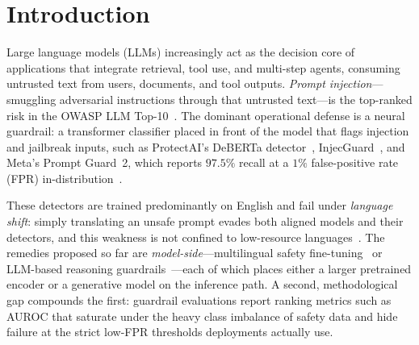 \documentclass[pdflatex,sn-mathphys-num]{sn-jnl}
\theoremstyle{plain}
\begin{document}

\maketitle

\section{Introduction}\label{sec:introduction}

Large language models (LLMs) increasingly act as the decision core of applications
that integrate retrieval, tool use, and multi-step agents, consuming untrusted text
from users, documents, and tool outputs. \emph{Prompt injection}---smuggling
adversarial instructions through that untrusted text---is the top-ranked risk in the
OWASP LLM Top-10~\cite{owasp2025}. The dominant operational defense is a neural
guardrail: a transformer classifier placed in front of the model that flags
injection and jailbreak inputs, such as ProtectAI's DeBERTa detector~\cite{protectai2024},
InjecGuard~\cite{injecguard2024}, and Meta's Prompt Guard~2, which reports $97.5\%$
recall at a $1\%$ false-positive rate (FPR) in-distribution~\cite{metapromptguard2}.

These detectors are trained predominantly on English and fail under
\emph{language shift}: simply translating an unsafe prompt evades both aligned
models and their detectors, and this weakness is not confined to low-resource
languages~\cite{yong2023lowresource,deng2024multilingual,babel2025}. The remedies
proposed so far are \emph{model-side}---multilingual safety
fine-tuning~\cite{deng2024multilingual} or LLM-based reasoning
guardrails~\cite{mrguard2025,sealguard2025}---each of which places either a larger
pretrained encoder or a generative model on the inference path. A second,
methodological gap compounds the first: guardrail evaluations report ranking
metrics such as AUROC that saturate under the heavy class imbalance of safety data
and hide failure at the strict low-FPR thresholds deployments actually use.
\end{document}
